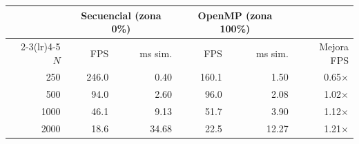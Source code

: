 \begin{tabular}{rrrrrr}
\toprule
& \multicolumn{2}{c}{Secuencial (zona 0\%)} & \multicolumn{2}{c}{OpenMP (zona 100\%)} & \\
\cmidrule(lr){2-3}\cmidrule(lr){4-5}
$N$ & FPS & ms sim. & FPS & ms sim. & Mejora FPS \\
\midrule
250 & 246.0 & 0.40 & 160.1 & 1.50 & 0.65$\times$ \\
500 & 94.0 & 2.60 & 96.0 & 2.08 & 1.02$\times$ \\
1000 & 46.1 & 9.13 & 51.7 & 3.90 & 1.12$\times$ \\
2000 & 18.6 & 34.68 & 22.5 & 12.27 & 1.21$\times$ \\
\bottomrule
\end{tabular}
